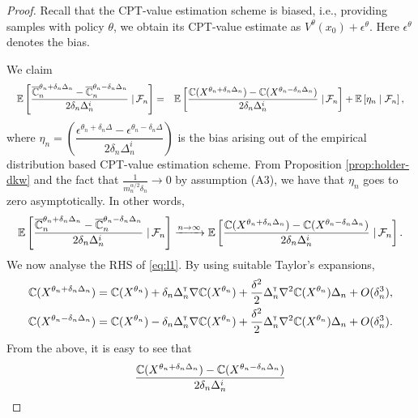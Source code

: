 \documentclass{article}
\numberwithin{equation}{section}
\numberwithin{theorem}{section}
\begin{document}
\begin{proof}
Recall that the CPT-value estimation scheme is biased, i.e., providing samples with policy $\theta$, we obtain its CPT-value estimate as $V^{\theta}(x_0) + \epsilon^\theta$. Here $\epsilon^\theta$ denotes the bias. 

We claim
\begin{align}
\quad\mathbb{E}\left[\dfrac{\overline {\mathbb{C}}_n^{\theta_n+\delta_n \Delta_n} -\overline {\mathbb{C}}_n^{\theta_n-\delta_n \Delta_n}}{2 \delta_n \Delta_n^{i}} \left.\right| \mathcal{F}_n\right] 
= \quad&\mathbb{E}\left[\dfrac{\mathbb{C}(X^{\theta_n + \delta_n \Delta_n}) - \mathbb{C}(X^{\theta_n - \delta_n \Delta_n})}{2 \delta_n \Delta_n^{i}} \left.\right| \mathcal{F}_n\right] + \mathbb{E}\left[ \eta_n \mid \mathcal{F}_n\right],
\end{align}
where $\eta_n = \left(\dfrac{\epsilon^{\theta_n +\delta_n\Delta} - \epsilon^{\theta_n-\delta_n\Delta}}{2\delta_n\Delta_n^{i}}\right)$
 is the bias arising out of the empirical distribution based CPT-value estimation scheme.
From Proposition \ref{prop:holder-dkw} and the fact that $\frac{1}{m_n^{\alpha/2} \delta_n} \rightarrow 0$ by assumption (A3), we have that
$\eta_n$ goes to zero asymptotically. In other words,
\begin{align}
\quad\mathbb{E}\left[\dfrac{\overline {\mathbb{C}}_n^{\theta_n+\delta_n \Delta_n} -\overline {\mathbb{C}}_n^{\theta_n-\delta_n \Delta_n}}{2 \delta_n \Delta_n^{i}} \left.\right| \mathcal{F}_n\right] 
&\xrightarrow{n\rightarrow\infty}  \mathbb{E}\left[\dfrac{\mathbb{C}(X^{\theta_n + \delta_n \Delta_n}) -\mathbb{C}(X^{\theta_n - \delta_n \Delta_n})}{2 \delta_n \Delta_n^{i}} \left.\right| \mathcal{F}_n\right].  \label{eq:l1}
\end{align}
We now analyse the RHS of \eqref{eq:l1}.
By using suitable Taylor's expansions,
\begin{align*}
\mathbb{C}(X^{\theta_n + \delta_n \Delta_n}) = \mathbb{C}(X^{\theta_n}) + \delta_n \Delta_n^\mathsf{\scriptscriptstyle T} \nabla \mathbb{C}(X^{\theta_n}) + \frac{\delta^2}{2} \Delta_n^\mathsf{\scriptscriptstyle T} \nabla^2 \mathbb{C}(X^{\theta_n})\Delta_n + O(\delta_n^3), \\
\mathbb{C}(X^{\theta_n - \delta_n \Delta_n}) = \mathbb{C}(X^{\theta_n}) - \delta_n \Delta_n^\mathsf{\scriptscriptstyle T} \nabla \mathbb{C}(X^{\theta_n}) + \frac{\delta^2}{2} \Delta_n^\mathsf{\scriptscriptstyle T} \nabla^2 \mathbb{C}(X^{\theta_n})\Delta_n + O(\delta_n^3).\end{align*}
From the above, it is easy to see that 
\begin{align*}
\dfrac{\C(X^{\theta_n + \delta_n \Delta_n}) - \C(X^{\theta_n - \delta_n \Delta_n})}{2 \delta_n \Delta_n^i}

\end{align*}
\end{proof}
\end{document}
